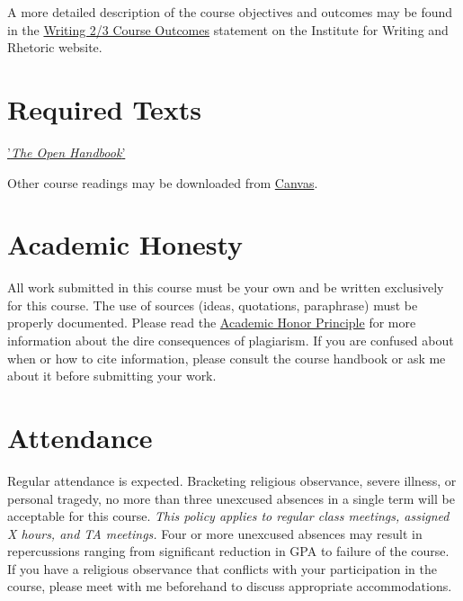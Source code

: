 \documentclass[letterpaper]{article}
\def\mylibbook#1{'#1'}%
\begin{document}
A more detailed description of the course objectives and outcomes may be found in the \href{http://dartmouth.edu/writing-speech/curriculum/writing-courses/writing-2-3/writing-2-3-course-outcomes}{Writing 2/3 Course Outcomes} statement on the Institute for Writing and Rhetoric website.


 
\section*{Required Texts}

\href{https://github.com/stockphrase/OpenHandbook/raw/master/Open%20Handbook.pdf}{\mylibbook{\emph{The Open Handbook}}} 

 Other course readings may be downloaded from \href{https://canvas.dartmouth.edu}{Canvas}.



\section*{Academic Honesty}
All work submitted in this course must be your own and be written exclusively for this course. The use of sources (ideas, quotations, paraphrase) must be properly documented. Please read the \href{https://students.dartmouth.edu/judicial-affairs/policy/academic-honor-principle}{Academic Honor Principle} for more information about the dire consequences of plagiarism. If you are confused about when or how to cite information, please consult the  course handbook or ask me about it before submitting your work. %

\section*{Attendance}
Regular attendance is expected. Bracketing religious observance, severe illness, or personal tragedy, no more than three unexcused absences in a single term will be acceptable for this course. \emph{This policy applies to regular class meetings, assigned X hours, and TA meetings.} Four or more unexcused absences may result in repercussions ranging from significant reduction in GPA to failure of the course. If you have a religious observance that conflicts with your participation in the course, please meet with me beforehand to discuss appropriate accommodations. 
\end{document}
